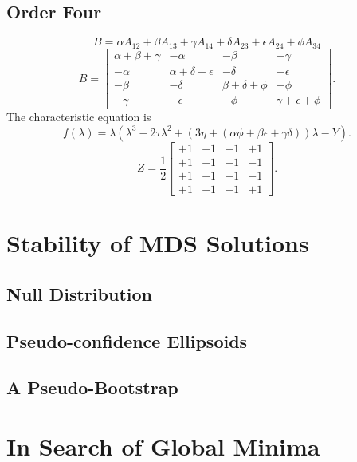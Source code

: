 \documentclass[
  12pt,
]{book}
\theoremstyle{definition}
\theoremstyle{definition}
\theoremstyle{definition}
\theoremstyle{definition}
\theoremstyle{remark}
\begin{document}
\hypertarget{order-four}{%
\section{Order Four}\label{order-four}}

\[
B=\alpha A_{12}+\beta A_{13}+\gamma A_{14}+\delta A_{23}+\epsilon A_{24}+\phi A_{34}
\]
\[
B=\begin{bmatrix}
\alpha+\beta+\gamma&-\alpha&-\beta&-\gamma\\
-\alpha&\alpha+\delta+\epsilon&-\delta&-\epsilon\\
-\beta&-\delta&\beta+\delta+\phi&-\phi\\
-\gamma&-\epsilon&-\phi&\gamma+\epsilon+\phi
\end{bmatrix}.
\]
The characteristic equation is
\[
f(\lambda)=\lambda(\lambda^3-2\tau\lambda^2+(3\eta+(\alpha\phi+\beta\epsilon+\gamma\delta))\lambda-Y).
\]
\[
Z=\frac12\begin{bmatrix}
+1&+1&+1&+1\\
+1&+1&-1&-1\\
+1&-1&+1&-1\\
+1&-1&-1&+1
\end{bmatrix}.
\]

\hypertarget{stability}{%
\chapter{Stability of MDS Solutions}\label{stability}}

\hypertarget{null-distribution}{%
\section{Null Distribution}\label{null-distribution}}

\hypertarget{pseudo-confidence-ellipsoids}{%
\section{Pseudo-confidence Ellipsoids}\label{pseudo-confidence-ellipsoids}}

\hypertarget{a-pseudo-bootstrap}{%
\section{A Pseudo-Bootstrap}\label{a-pseudo-bootstrap}}

\hypertarget{global}{%
\chapter{In Search of Global Minima}\label{global}}
\end{document}
